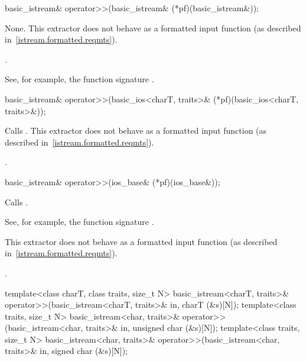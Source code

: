 %
\begin{itemdecl}
basic_istream& operator>>(basic_istream& (*pf)(basic_istream&));
\end{itemdecl}

\begin{itemdescr}
\pnum
\effects
None.
This extractor does not behave as a formatted input function
(as described in~\ref{istream.formatted.reqmts}).

\pnum
\returns
{}.%
%
\begin{footnote}
See, for example, the function signature
.
\end{footnote}
\end{itemdescr}

%
\begin{itemdecl}
basic_istream& operator>>(basic_ios<charT, traits>& (*pf)(basic_ios<charT, traits>&));
\end{itemdecl}

\begin{itemdescr}
\pnum
\effects
Calls
.
This extractor does not behave as a formatted input function
(as described in~\ref{istream.formatted.reqmts}).

\pnum
\returns
{}.
\end{itemdescr}

%
\begin{itemdecl}
basic_istream& operator>>(ios_base& (*pf)(ios_base&));
\end{itemdecl}

\begin{itemdescr}
\pnum
\effects
Calls
.
\begin{footnote}
See, for example, the function signature
.
\end{footnote}
This extractor does not behave as a formatted input function
(as described in~\ref{istream.formatted.reqmts}).

\pnum
\returns
{}.
\end{itemdescr}

%
\begin{itemdecl}
template<class charT, class traits, size_t N>
  basic_istream<charT, traits>& operator>>(basic_istream<charT, traits>& in, charT (&s)[N]);
template<class traits, size_t N>
  basic_istream<char, traits>& operator>>(basic_istream<char, traits>& in, unsigned char (&s)[N]);
template<class traits, size_t N>
  basic_istream<char, traits>& operator>>(basic_istream<char, traits>& in, signed char (&s)[N]);
\end{itemdecl}

